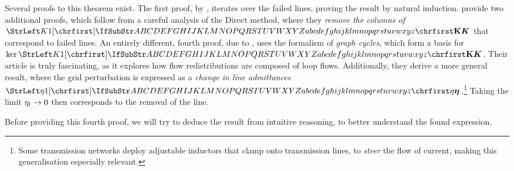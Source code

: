 \documentclass[main.tex]{subfiles}
\begin{document}
Several proofs to this theorem exist. The first proof, by \cite{Guler2007}, iterates over the failed lines, proving the result by natural induction. \citep{Guo2009} provide two additional proofs, which follow from a careful analysis of the Direct method, where they \emph{remove the columns of $\mat{K}$} that correspond to failed lines. An entirely different, fourth proof, due to \cite{Ronellenftisch2017}, uses the formalism of \emph{graph cycles}, which form a basis for $\ker \mat{K}$. Their article is truly fascinating, as it explores how flow redistributions are composed of loop flows. Additionally, they derive a more general result, where the grid perturbation is expressed as a \emph{change in line admittances $\mat{\eta}$}.\footnote{Some transmission networks deploy adjustable inductors that clamp onto transmission lines, to \emph{steer} the flow of current, making this generalisation especially relevant.} Taking the limit ${\mathrm{\eta}}_l \rightarrow 0$ then corresponds to the removal of the line.

Before providing this fourth proof, we will try to deduce the result from intuitive reasoning, to better understand the found expression.
\end{document}
